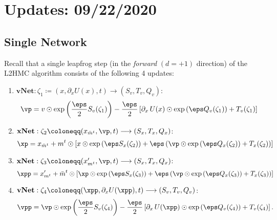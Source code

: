 %
\section{Updates: 09/22/2020}%
\label{sec:updates_2020_09_22}
\subsection{Single Network}%
\label{subsec:single_network}
%
Recall that a single leapfrog step (in the \emph{forward} \((d = +1)\)
direction) of the L2HMC algorithm consists of the following 4 updates:
\begin{enumerate}
  \item \(\mathrm{\textbf{vNet}}: \zeta_{1} \coloneqq (x, \partial_{x}U(x), t)
    \longrightarrow (S_{v}, T_{v}, Q_{v})\):
    \begin{equation}
      \vp = v \odot \exp{\left(\frac{\eps}{2}S_{v}(\zeta_{1})\right)}%
             - \frac{\eps}{2}\left[\partial_{x}\,U(x)\odot \exp{\left(\eps
               Q_{v}(\zeta_{1})\right)}%
             + T_{v}(\zeta_{1})\right]
    \end{equation}
  \item \(\mathrm{\mathbf{xNet}}: \zeta_{2} \coloneqq 
    (x_{\bar{m}^{t}}, \vp, t) \longrightarrow (S_{x}, T_{x}, Q_{x})\):
    \begin{equation}
      \xp = x_{\bar{m}^{t}} + m^{t}\odot \left[x \odot \exp{\left(\eps
              S_{x}(\zeta_{2})\right)}%
            + \eps\left(\vp\odot\exp{\left(\eps Q_{x}(\zeta_{2})\right)} 
            + T_{x}(\zeta_{2})\right)\right]
    \end{equation}
  \item \(\mathrm{\mathbf{xNet}}: \zeta_{3} \coloneqq (x_{m^{t}}^{\prime}, \vp,
    t) \longrightarrow (S_{x}, T_{x}, Q_{x})\):
    \begin{equation}
      \xpp = x^{\prime}_{m^{t}} + \bar{m}^{t}\odot \left[\xp \odot \exp{\left(\eps
              S_{x}(\zeta_{3})\right)}%
            + \eps\left(\vp\odot\exp{\left(\eps Q_{x}(\zeta_{3})\right)}
            + T_{x}(\zeta_{3})\right)\right]
    \end{equation}
  \item \(\mathrm{\mathbf{vNet}}: \zeta_{4} \coloneqq (\xpp,
    \partial_{x}U(\xpp), t) \longrightarrow (S_{v}, T_{v}, Q_{v})\):
    \begin{equation}
      \vpp = \vp \odot \exp{\left(\frac{\eps}{2}S_{v}(\zeta_{4})\right)}%
              - \frac{\eps}{2}\left[\partial_{x}\,U(\xpp)\odot \exp{\left(\eps
                  Q_{v}(\zeta_{4})\right)}%
              + T_{v}(\zeta_{4})\right].
    \end{equation}
\end{enumerate}
%

